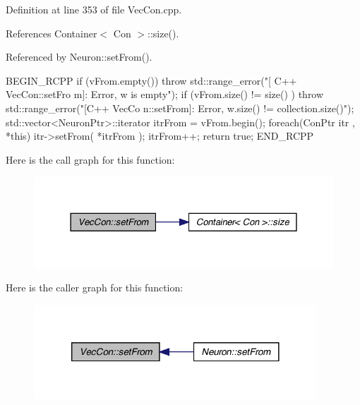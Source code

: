 Definition at line 353 of file VecCon.cpp.



References Container$<$ Con $>$::size().



Referenced by Neuron::setFrom().


\begin{DoxyCode}
                                                     {
        BEGIN_RCPP
                if (vFrom.empty()) { throw std::range_error("[ C++ VecCon::setFro
      m]: Error, w is empty"); }
                if (vFrom.size() != size() ) { throw std::range_error("[C++ VecCo
      n::setFrom]: Error, w.size() != collection.size()"); }
                std::vector<NeuronPtr>::iterator itrFrom = vFrom.begin();
                foreach(ConPtr itr , *this)     {
                        itr->setFrom( *itrFrom );
                        itrFrom++;
                }
                return true;
                END_RCPP
}
\end{DoxyCode}


Here is the call graph for this function:
\nopagebreak
\begin{figure}[H]
\begin{center}
\leavevmode
\includegraphics[width=328pt]{class_vec_con_ad5327f9345cc4dee223ba7f1038ad9ec_cgraph}
\end{center}
\end{figure}




Here is the caller graph for this function:
\nopagebreak
\begin{figure}[H]
\begin{center}
\leavevmode
\includegraphics[width=300pt]{class_vec_con_ad5327f9345cc4dee223ba7f1038ad9ec_icgraph}
\end{center}
\end{figure}


